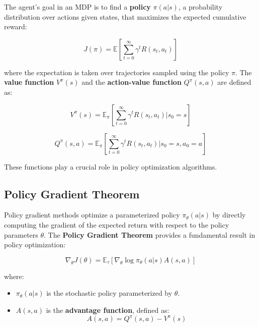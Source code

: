 \documentclass[12pt]{extreport} %
\begin{document}
The agent's goal in an MDP is to find a \textbf{policy} \( \pi(a | s) \), a probability distribution over actions given states, that maximizes the expected cumulative reward:

\begin{equation}
J(\pi) = \mathbb{E} \left[ \sum_{t=0}^{\infty} \gamma^t R(s_t, a_t) \right]
\end{equation}

where the expectation is taken over trajectories sampled using the policy \( \pi \). The \textbf{value function} \( V^\pi(s) \) and the \textbf{action-value function} \( Q^\pi(s, a) \) are defined as:

\begin{equation}
V^\pi(s) = \mathbb{E}_\pi \left[ \sum_{t=0}^{\infty} \gamma^t R(s_t, a_t) \Big| s_0 = s \right]
\end{equation}

\begin{equation}
Q^\pi(s, a) = \mathbb{E}_\pi \left[ \sum_{t=0}^{\infty} \gamma^t R(s_t, a_t) \Big| s_0 = s, a_0 = a \right]
\end{equation}

These functions play a crucial role in policy optimization algorithms.

\subsection{Policy Gradient Theorem}

Policy gradient methods optimize a parameterized policy \( \pi_\theta(a|s) \) by directly computing the gradient of the expected return with respect to the policy parameters \( \theta \). The \textbf{Policy Gradient Theorem} \cite{sutton1999policy} provides a fundamental result in policy optimization:

\begin{equation}
\nabla_\theta J(\theta) = \mathbb{E}_{\tau} \left[ \nabla_\theta \log \pi_\theta(a | s) A(s, a) \right]
\end{equation}

where:
\begin{itemize}
    \item \( \pi_\theta(a|s) \) is the stochastic policy parameterized by \( \theta \).
    \item \( A(s, a) \) is the \textbf{advantage function}, defined as:
    \begin{equation}
    A(s, a) = Q^\pi(s, a) - V^\pi(s)
    \end{equation}
\end{itemize}
\end{document}
